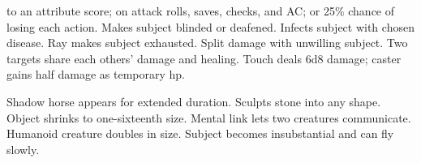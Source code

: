 \begin{swspelllist}
    to an attribute score;  on attack rolls, saves, checks, and AC; or 25\% chance of losing each action.
   Makes subject blinded or deafened.
   Infects subject with chosen disease.
   Ray makes subject exhausted.
   Split damage with unwilling subject.
   Two targets share each others' damage and healing.
   Touch deals 6d8 damage; caster gains half damage as temporary hp.

   Shadow horse appears for extended duration.
   Sculpts stone into any shape.
   Object shrinks to one-sixteenth size.
   Mental link lets two creatures communicate.
   Humanoid creature doubles in size.
   Subject becomes insubstantial and can fly slowly.
\end{swspelllist}

